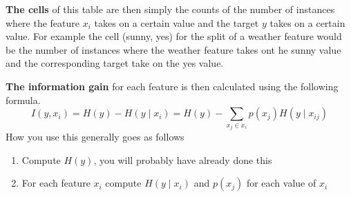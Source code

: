 \documentclass[12pt]{article}
\begin{document}
\textbf{The cells} of this table are then simply the counts of the number of instances where the feature $x_i$ takes on a certain value and the target $y$ takes on a certain value. For example the cell (sunny, yes) for the split of a weather feature would be the number of instances where the weather feature takes ont he sunny value and the corresponding target take on the yes value. 
\smallskip

\textbf{The information gain} for each feature is then calculated using the following formula. 
\[
    I(y, x_i) = H(y) - H(y\mid x_i) = H(y) - \sum_{x_j\in x_i}p(x_{j})H(y\mid x_{ij})
\]
How you use this generally goes as follows 
\begin{enumerate}[leftmargin=*, noitemsep]
    \item Compute $H(y)$, you will probably have already done this 
    \item For each feature $x_i$ compute $H(y\mid x_i)$ and $p(x_{j})$ for each value of $x_i$
\end{enumerate}
\end{document}
